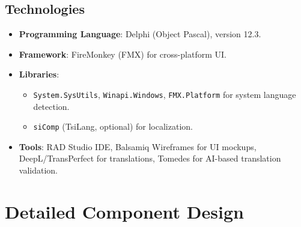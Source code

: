 \documentclass[12pt,a4paper]{article}
\begin{document}
	\subsection{Technologies}
	\begin{itemize}
		\item \textbf{Programming Language}: Delphi (Object Pascal), version 12.3.
		\item \textbf{Framework}: FireMonkey (FMX) for cross-platform UI.
		\item \textbf{Libraries}:
		\begin{itemize}
			\item \texttt{System.SysUtils}, \texttt{Winapi.Windows}, \texttt{FMX.Platform} for system language detection.
			\item \texttt{siComp} (TsiLang, optional) for localization.
		\end{itemize}
		\item \textbf{Tools}: RAD Studio IDE, Balsamiq Wireframes for UI mockups, DeepL/TransPerfect for translations, Tomedes for AI-based translation validation.
	\end{itemize}
	
	\section{Detailed Component Design}
\end{document}
